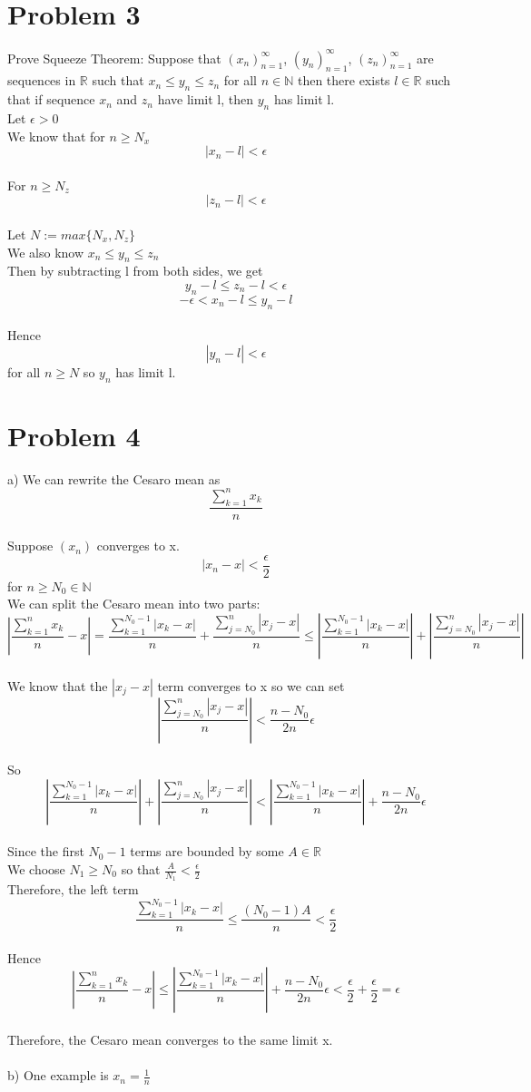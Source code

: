 \documentclass{article}
\begin{document}
\section*{Problem 3}
Prove Squeeze Theorem: Suppose that $(x_n)_{n=1}^{\infty}$, $(y_n)_{n=1}^{\infty}$, $(z_n)_{n=1}^{\infty}$ are sequences in $\mathbb{R}$ such that $x_n \leq y_n \leq z_n$ for all $n \in \mathbb{N}$ then there exists $l \in \mathbb{R}$ such that if sequence $x_n$ and $z_n$ have limit l, then $y_n$ has limit l.
\\Let $\epsilon > 0$
\\We know that for $n \geq N_x$ $$|x_n - l| < \epsilon$$
\\For $n \geq N_z$ $$|z_n - l| < \epsilon$$
\\Let $N := max\{N_x, N_z\}$
\\We also know $x_n \leq y_n \leq z_n$
\\Then by subtracting l from both sides, we get $$y_n - l \leq z_n - l < \epsilon$$
$$-\epsilon < x_n - l \leq y_n - l$$
\\Hence $$|y_n - l| < \epsilon$$ for all $n \geq N$ so $y_n$ has limit l.

\section*{Problem 4}
a) We can rewrite the Cesaro mean as $$\frac{\sum_{k=1}^{n}x_k}{n}$$ \\Suppose $(x_n)$ converges to x.
\\$$|x_n - x| < \frac{\epsilon}{2}$$ for $n \geq N_0 \in \mathbb{N}$
\\We can split the Cesaro mean into two parts: $$|\frac{\sum_{k=1}^{n} x_k}{n} - x| = \frac{\sum_{k=1}^{N_0-1} |x_k - x|}{n} + \frac{\sum_{j=N_0}^{n} |x_j - x|}{n} \leq |\frac{\sum_{k=1}^{N_0-1} |x_k - x|}{n}| + |\frac{\sum_{j=N_0}^{n} |x_j - x|}{n}|$$ 
\\We know that the $|x_j - x|$ term converges to x so we can set $$|\frac{\sum_{j=N_0}^{n} |x_j - x|}{n}| < \frac{n-N_0}{2n}\epsilon$$
\\ So $$|\frac{\sum_{k=1}^{N_0-1} |x_k - x|}{n}| + |\frac{\sum_{j=N_0}^{n} |x_j - x|}{n}| 
< |\frac{\sum_{k=1}^{N_0-1} |x_k - x|}{n}| + \frac{n-N_0}{2n}\epsilon$$
\\Since the first $N_0 - 1$ terms are bounded by some $A \in \mathbb{R}$
\\We choose $N_1 \geq N_0$ so that $\frac{A}{N_1} < \frac{\epsilon}{2}$
\\Therefore, the left term $$\frac{\sum_{k=1}^{N_0-1} |x_k - x|}{n} \leq \frac{(N_0 - 1)A}{n} < \frac{\epsilon}{2}$$
\\Hence $$|\frac{\sum_{k=1}^{n} x_k}{n} - x| \leq |\frac{\sum_{k=1}^{N_0-1} |x_k - x|}{n}| + \frac{n-N_0}{2n}\epsilon < \frac{\epsilon}{2} + \frac{\epsilon}{2} = \epsilon$$
\\Therefore, the Cesaro mean converges to the same limit x.
\\
\\b) One example is $x_n = \frac{1}{n}$
\end{document}
